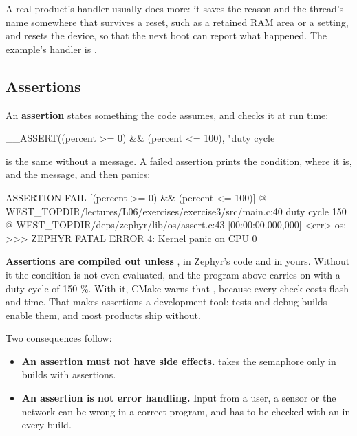 A real product’s handler usually does more: it saves the reason and the thread’s name somewhere that
survives a reset, such as a retained RAM area or a setting, and resets the device, so that the next
boot can report what happened. The  example’s handler is
.

\subsection{Assertions}
An \textbf{assertion} states something the code assumes, and checks it at run time:

\begin{ccode}
__ASSERT((percent >= 0) && (percent <= 100), "duty cycle %
\end{ccode}

\noindent {} is the same without a message. A failed assertion prints
the condition, where it is, and the message, and then panics:

\begin{console}
ASSERTION FAIL [(percent >= 0) && (percent <= 100)] @ WEST_TOPDIR/lectures/L06/exercises/exercise3/src/main.c:40
	duty cycle 150 %
@ WEST_TOPDIR/deps/zephyr/lib/os/assert.c:43
[00:00:00.000,000] <err> os: >>> ZEPHYR FATAL ERROR 4: Kernel panic on CPU 0
\end{console}

\noindent \textbf{Assertions are compiled out unless }, in Zephyr’s code and
in yours. Without it the condition is not even evaluated, and the program above carries on with a
duty cycle of 150 \%. With it, CMake warns that ,
because every check costs flash and time. That makes assertions a development tool: tests and debug
builds enable them, and most products ship without.

Two consequences follow:

\begin{itemize}
  \item \textbf{An assertion must not have side effects.}
     takes the semaphore only in builds with
assertions.
  \item \textbf{An assertion is not error handling.} Input from a user, a sensor or the network can be wrong
    in a correct program, and has to be checked with an  in every build.
\end{itemize}

